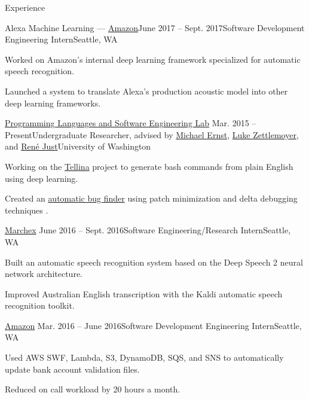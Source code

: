 \documentclass{resume}
\begin{document}
\begin{rSection}{Experience}

  \begin{rSubsection}{Alexa Machine Learning --- {\href{https://www.amazon.com/}{Amazon}}}{June 2017 -- Sept. 2017}{Software Development Engineering Intern}{Seattle, WA}
    \item Worked on Amazon's internal deep learning framework specialized for automatic
    speech recognition.
    \item Launched a system to translate Alexa's production acoustic model into other deep learning frameworks.
  \end{rSubsection}

  \begin{rSubsection}{\href{https://uwplse.org/}{Programming Languages and Software Engineering Lab}}
    {Mar. 2015 -- Present}{Undergraduate Researcher, advised by \href{https://homes.cs.washington.edu/~mernst/}{Michael Ernst}, \href{https://www.cs.washington.edu/people/faculty/lsz}{Luke Zettlemoyer}, and \href{https://people.cs.umass.edu/~rjust/}{Ren{\'e} Just}}{University of Washington}
  \item Working on the \href{https://github.com/TellinaTool}{Tellina} project \citep{LinWPVZE2017:TR} to generate bash commands from plain English using deep learning.
  \item Created an \href{https://github.com/dericp/patch-minimization}{automatic bug finder} using patch minimization and delta debugging techniques \citep{PearsonCJFAEPK2017}.
  \end{rSubsection}
  
  \begin{rSubsection}{\href{http://www.marchex.com/}{Marchex}}
    {June 2016 -- Sept. 2016}{Software Engineering/Research Intern}{Seattle, WA}
  \item Built an automatic speech recognition system based on the Deep Speech 2 neural network architecture.
  \item Improved Australian English transcription with the Kaldi automatic speech recognition toolkit.
  \end{rSubsection}

  \begin{rSubsection}{\href{https://www.amazon.com/}{Amazon}}
    {Mar. 2016 -- June 2016}{Software Development Engineering Intern}{Seattle, WA}
  \item Used AWS SWF, Lambda, S3, DynamoDB, SQS, and SNS to automatically update bank account validation files.
  \item Reduced on call workload by 20 hours a month.
  \end{rSubsection}
  

\end{rSection}
\end{document}
